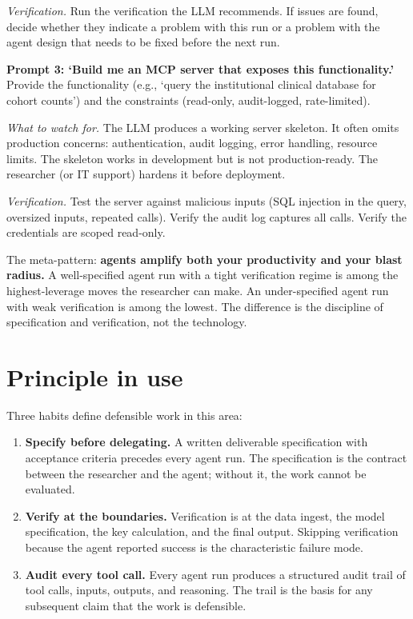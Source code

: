 \documentclass[
  letterpaper,
  11pt]{scrbook}
\begin{document}
\emph{Verification.} Run the verification the LLM recommends. If issues
are found, decide whether they indicate a problem with this run or a
problem with the agent design that needs to be fixed before the next
run.

\textbf{Prompt 3: `Build me an MCP server that exposes this
functionality.'} Provide the functionality (e.g., `query the
institutional clinical database for cohort counts') and the constraints
(read-only, audit-logged, rate-limited).

\emph{What to watch for.} The LLM produces a working server skeleton. It
often omits production concerns: authentication, audit logging, error
handling, resource limits. The skeleton works in development but is not
production-ready. The researcher (or IT support) hardens it before
deployment.

\emph{Verification.} Test the server against malicious inputs (SQL
injection in the query, oversized inputs, repeated calls). Verify the
audit log captures all calls. Verify the credentials are scoped
read-only.

The meta-pattern: \textbf{agents amplify both your productivity and your
blast radius.} A well-specified agent run with a tight verification
regime is among the highest-leverage moves the researcher can make. An
under-specified agent run with weak verification is among the lowest.
The difference is the discipline of specification and verification, not
the technology.

\section{Principle in use}\label{principle-in-use-7}

Three habits define defensible work in this area:

\begin{enumerate}
\def\labelenumi{\arabic{enumi}.}
\item
  \textbf{Specify before delegating.} A written deliverable
  specification with acceptance criteria precedes every agent run. The
  specification is the contract between the researcher and the agent;
  without it, the work cannot be evaluated.
\item
  \textbf{Verify at the boundaries.} Verification is at the data ingest,
  the model specification, the key calculation, and the final output.
  Skipping verification because the agent reported success is the
  characteristic failure mode.
\item
  \textbf{Audit every tool call.} Every agent run produces a structured
  audit trail of tool calls, inputs, outputs, and reasoning. The trail
  is the basis for any subsequent claim that the work is defensible.
\end{enumerate}
\end{document}
